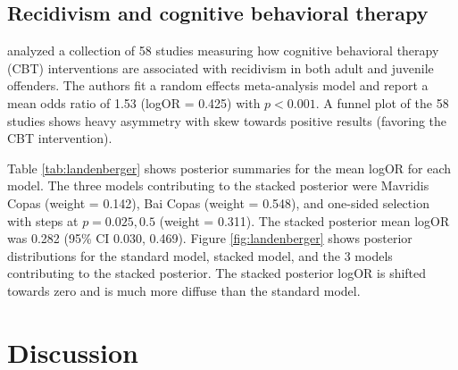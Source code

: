 \documentclass[12pt]{article}   	%
\numberwithin{equation}{section}
\begin{document}
\subsection{Recidivism and cognitive behavioral therapy} 

\citet{landenberger2005recidivism} analyzed a collection of 58 studies measuring how cognitive behavioral therapy (CBT) interventions are associated with recidivism in both adult and juvenile offenders. The authors fit a random effects meta-analysis model and report a mean odds ratio of 1.53 (logOR = 0.425) with $p < 0.001$. A funnel plot of the 58 studies shows heavy asymmetry with skew towards positive results (favoring the CBT intervention). 

Table \ref{tab:landenberger} shows posterior summaries for the mean logOR for each model. The three models contributing to the stacked posterior were Mavridis Copas (weight = 0.142), Bai Copas (weight = 0.548), and one-sided selection with steps at $p = 0.025, 0.5$ (weight = 0.311). The stacked posterior mean logOR was 0.282 (95\% CI 0.030, 0.469). Figure \ref{fig:landenberger} shows posterior distributions for the standard model, stacked model, and the 3 models contributing to the stacked posterior. The stacked posterior logOR is shifted towards zero and is much more diffuse than the standard model. 

\section{Discussion}




\end{document}
